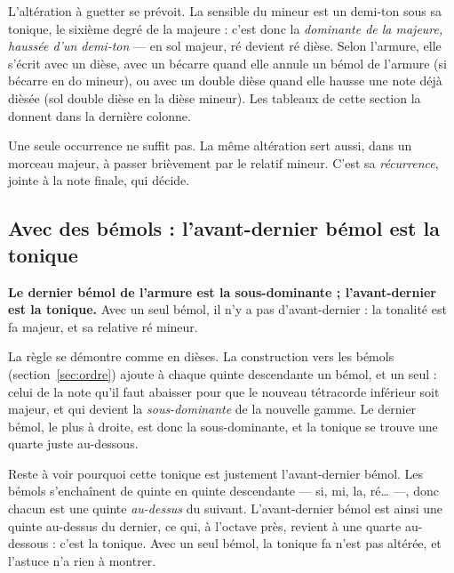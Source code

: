 \documentclass[a4paper,11pt]{article}
\begin{document}
L'altération à guetter se prévoit. La sensible du mineur est un demi-ton sous
sa tonique, le sixième degré de la majeure : c'est donc la \emph{dominante de
la majeure, haussée d'un demi-ton} — en sol majeur, ré devient ré dièse. Selon
l'armure, elle s'écrit avec un dièse, avec un bécarre quand elle annule un
bémol de l'armure (si bécarre en do mineur), ou avec un double dièse quand elle
hausse une note déjà dièsée (sol double dièse en la dièse mineur). Les
tableaux de cette section la donnent dans la dernière colonne.

\begin{remarque}
Une seule occurrence ne suffit pas. La même altération sert aussi, dans un
morceau majeur, à passer brièvement par le relatif mineur. C'est sa
\emph{récurrence}, jointe à la note finale, qui décide.
\end{remarque}

\subsection{Avec des bémols : l'avant-dernier bémol est la tonique}

\begin{remarque}
\textbf{Le dernier bémol de l'armure est la sous-dominante ; l'avant-dernier
est la tonique.} Avec un seul bémol, il n'y a pas d'avant-dernier : la
tonalité est fa majeur, et sa relative ré mineur.
\end{remarque}

\begin{center}

\end{center}

La règle se démontre comme en dièses. La construction vers les bémols
(section~\ref{sec:ordre}) ajoute à chaque quinte descendante un bémol, et
un seul : celui de la note qu'il faut abaisser pour que le nouveau tétracorde
inférieur soit majeur, et qui devient la \emph{sous-dominante} de la nouvelle
gamme. Le dernier bémol, le plus à droite, est donc la sous-dominante, et la
tonique se trouve une quarte juste au-dessous.

Reste à voir pourquoi cette tonique est justement l'avant-dernier bémol. Les
bémols s'enchaînent de quinte en quinte descendante — si, mi, la, ré… —, donc
chacun est une quinte \emph{au-dessus} du suivant. L'avant-dernier bémol est
ainsi une quinte au-dessus du dernier, ce qui, à l'octave près, revient à une
quarte au-dessous : c'est la tonique. Avec un seul bémol, la tonique fa n'est
pas altérée, et l'astuce n'a rien à montrer.
\end{document}
